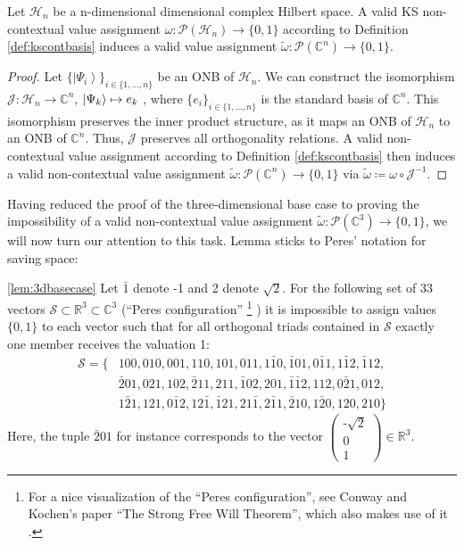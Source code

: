 \begin{lemma}
Let $\mathcal{H}_{n}$ be a n-dimensional dimensional complex Hilbert space. A valid KS non-contextual value assignment $\omega:\mathcal{P}(\mathcal{H}_{n})\rightarrow\{0,1\}$ according to Definition \ref{def:kscontbasis} induces a valid value assignment $\tilde{\omega}:\mathcal{P}(\mathbb{C}^{n})\rightarrow\{0,1\}$.
\end{lemma}

\begin{proof}
Let $\{\left|\Psi_{i}\right\rangle \}_{i\in\{1,\dots,n\}}$ be an ONB of $\mathcal{H}_{n}$. We can construct the isomorphism $\mathcal{J}:\mathcal{\mathcal{H}}_{n}\rightarrow\mathbb{C}^{n}$, $\ket{\Psi_{k}} \mapsto e_{k}$ , where $\{e_{i}\}_{i\in\{1,\dots,n\}}$ is the standard basis of $\mathbb{C}^{n}$. This isomorphism preserves the inner product structure, as it maps an ONB of $\mathcal{H}_{n}$ to an ONB of $\mathbb{C}^{n}$. Thus, $\mathcal{J}$ preserves all orthogonality relations. A valid non-contextual value assignment according to Definition \ref{def:kscontbasis} then induces a valid non-contextual value assignment $\tilde{\omega}:\mathcal{P}(\mathbb{C}^{n})\rightarrow\{0,1\}$ via $\tilde{\omega}\coloneqq\omega\circ\mathcal{J}^{-1}$.
\end{proof}

Having reduced the proof of the three-dimensional base case to proving the impossibility of a valid non-contextual value assignment $\tilde{\omega}:\mathcal{P}(\mathbb{C}^{3})\rightarrow\{0,1\}$, we will now turn our attention to this task. Lemma \label{lem:3dbasecase} sticks to Peres' notation \cite{Peres1991} for saving space:

\begin{lemma}
\ref{lem:3dbasecase}
Let $\bar{1}$ denote -1 and 2 denote $\sqrt{2}$. For the following set of 33 vectors $\mathcal{S}\subset\mathbb{R}^{3}\subset\mathbb{C}^{3}$ (“Peres configuration” \footnote{For a nice visualization of the “Peres configuration”, see Conway and Kochen's paper “The Strong Free Will Theorem”, which also makes use of it \cite{Conway2011}.} \cite{Peres1991}) it is impossible to assign values $\{0,1\}$ to each vector such that for all orthogonal triads contained in $\mathcal{S}$ exactly one member receives the valuation 1:
\begin{equation*}
\begin{split}
\mathcal{S}= \{ & 100,010,001,110,101,011,1\bar{1}0,\bar{1}01,0\bar{1}1,1\bar{1}2,\bar{1}12, \\
& \bar{2}01,021,102,\bar{2}11,211,\bar{1}02,201,\bar{1}\bar{1}2,112,0\bar{2}1,012, \\
& 1\bar{2}1,121,0\bar{1}2,12\bar{1},\bar{1}21,21\bar{1},2\bar{1}1,\bar{2}10,1\bar{2}0,120,210\} 
\end{split}
\end{equation*}
Here, the tuple $\bar{2}01$ for instance corresponds to the vector 
$\begin{pmatrix}
\text{-}\sqrt{2}\\
0\\
1
\end{pmatrix}\in\mathbb{R}^{3}.$
\end{lemma}

